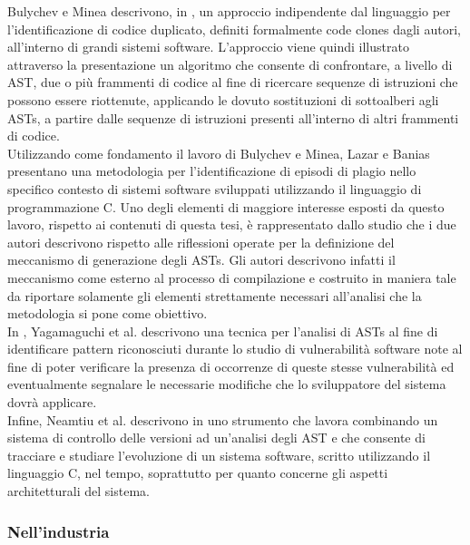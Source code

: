 Bulychev e Minea descrivono, in \cite{peter2008duplicate}, un approccio
indipendente dal linguaggio per l’identificazione di codice duplicato, definiti
formalmente code clones dagli autori, all’interno di grandi sistemi software.
L’approccio viene quindi illustrato attraverso la presentazione un algoritmo
che consente di confrontare, a livello di AST, due o più frammenti di codice al
fine di ricercare sequenze di istruzioni che possono essere riottenute,
applicando le dovuto sostituzioni di sottoalberi agli ASTs, a partire dalle
sequenze di istruzioni presenti all’interno di altri frammenti di codice.\\

Utilizzando come fondamento il lavoro di Bulychev e Minea, Lazar e Banias
presentano una metodologia \cite{DBLP:conf/saci/LazarB14} per l’identificazione
di episodi di plagio nello specifico contesto di sistemi software sviluppati
utilizzando il linguaggio di programmazione C. Uno degli elementi di maggiore
interesse esposti da questo lavoro, rispetto ai contenuti di questa tesi, è
rappresentato dallo studio che i due autori descrivono rispetto alle
riflessioni operate per la definizione del meccanismo di generazione degli
ASTs. Gli autori descrivono infatti il meccanismo come esterno al processo di
compilazione e costruito in maniera tale da riportare solamente gli elementi
strettamente necessari all’analisi che la metodologia si pone come obiettivo.\\

In \cite{DBLP:conf/acsac/YamaguchiLR12}, Yagamaguchi et al. descrivono una
tecnica per l’analisi di ASTs al fine di identificare pattern riconosciuti
durante lo studio di vulnerabilità software note al fine di poter verificare la
presenza di occorrenze di queste stesse vulnerabilità ed eventualmente
segnalare le necessarie modifiche che lo sviluppatore del sistema dovrà
applicare.\\

Infine, Neamtiu et al. descrivono in \cite{DBLP:journals/sigsoft/NeamtiuFH05}
uno strumento che lavora combinando un sistema di controllo delle versioni ad
un’analisi degli AST e che consente di tracciare e studiare l’evoluzione di un
sistema software, scritto utilizzando il linguaggio C, nel tempo, soprattutto
per quanto concerne gli aspetti architetturali del sistema.

\subsubsection{Nell’industria}

